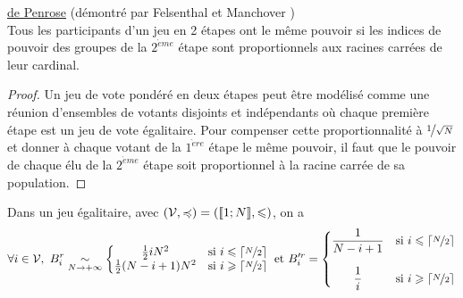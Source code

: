 \begin{theoreme}
	\underline{de Penrose} (démontré par Felsenthal et Manchover \cite{penrose62}) \\
	Tous les participants d’un jeu en 2 étapes ont le même pouvoir si les indices de pouvoir des groupes de la $2^{\grave{e}me}$ étape sont proportionnels aux racines carrées de leur cardinal.
\end{theoreme}

\begin{proof}
	Un jeu de vote pondéré en deux étapes peut être modélisé comme une réunion d’ensembles de votants disjoints et indépendants où chaque première étape est un jeu de vote égalitaire.
	Pour compenser cette proportionnalité à $\nicefrac{1}{\sqrt{N}}$ et donner à chaque votant de la $1^{\grave{e}re}$ étape le même pouvoir, il faut que le pouvoir de chaque élu de la $2^{\grave{e}me}$ étape soit proportionnel à la racine carrée de sa population.
\end{proof}

\begin{proposition}
	Dans un jeu égalitaire, avec $(\mathcal{V}, \preccurlyeq) = ([\![1;N]\!], \leqslant)$, on a
	\begin{equation}
		\forall i \in \mathcal{V}, \
		B_i^r \underset{N \rightarrow +\infty}{\sim} \left\{ \begin{matrix}
			\frac{1}{2} i N^2 & \text{si } i \leqslant \lceil\nicefrac{N}{2}\rceil \\
			\frac{1}{2} (N - i + 1) N^2 & \text{si } i \geqslant \lceil\nicefrac{N}{2}\rceil \\
		\end{matrix} \right.
		\text{ et }
		B_i'^r = \left\{ \begin{matrix}
			\displaystyle \frac{1}{N - i + 1} & \text{si } i \leqslant \lceil\nicefrac{N}{2}\rceil \\
			~\\
			\displaystyle \frac{1}{i} & \text{si } i \geqslant \lceil\nicefrac{N}{2}\rceil \\
		\end{matrix} \right.
	\end{equation}
\end{proposition}

